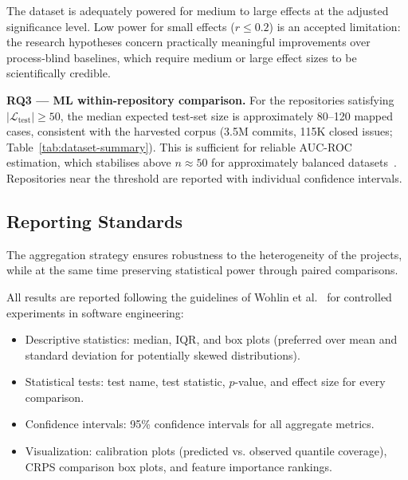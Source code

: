 The dataset is adequately powered for medium to large effects at the
adjusted significance level. Low power for small effects ($r \leq 0.2$)
is an accepted limitation: the research hypotheses concern practically
meaningful improvements over process-blind baselines, which require
medium or large effect sizes to be scientifically credible.

\textbf{RQ3 — ML within-repository comparison.}
For the repositories satisfying
$|\mathcal{L}_{\text{test}}| \geq 50$, the median expected test-set
size is approximately 80--120 mapped cases, consistent with the harvested
corpus (3.5M commits, 115K closed issues;
Table~\ref{tab:dataset-summary}). This is
sufficient for reliable AUC-ROC estimation, which stabilises above
$n \approx 50$ for approximately balanced
datasets~\cite{hanley1982meaning}. Repositories near the threshold are
reported with individual confidence intervals.


\subsection{Reporting Standards}
\label{sec:reporting}
The aggregation strategy ensures robustness to the heterogeneity of the projects, while at the same time preserving statistical power through paired comparisons.

All results are reported following the guidelines of 
Wohlin et al.~\cite{wohlin2012experimentation} for controlled 
experiments in software engineering:

\begin{itemize}
    \item Descriptive statistics: median, IQR, and box plots 
    (preferred over mean and standard deviation for potentially 
    skewed distributions).
    
    \item Statistical tests: test name, test statistic, $p$-value, 
    and effect size for every comparison.
    
    \item Confidence intervals: 95\% confidence intervals for all 
    aggregate metrics.
    
    \item Visualization: calibration plots (predicted vs. observed 
    quantile coverage), CRPS comparison box plots, and feature 
    importance rankings.
\end{itemize}


